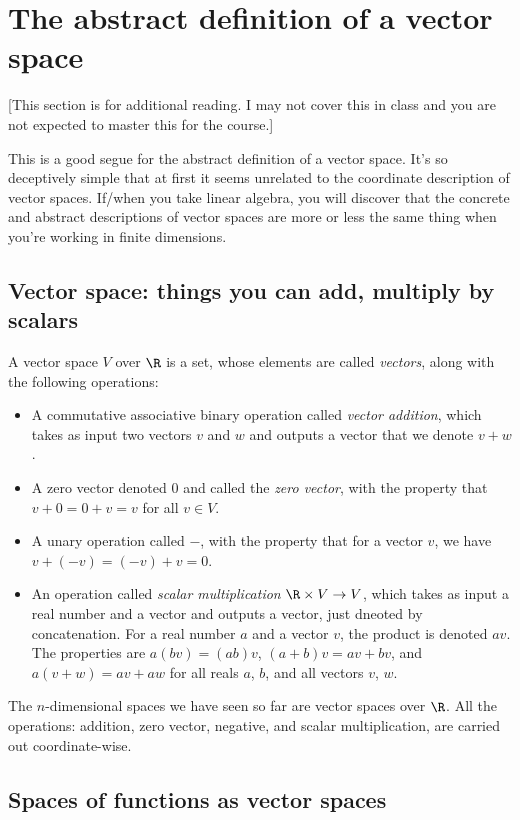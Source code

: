 \section{The abstract definition of a vector space}

[This section is for additional reading. I may not cover this in class
and you are not expected to master this for the course.]

This is a good segue for the abstract definition of a vector
space. It's so deceptively simple that at first it seems unrelated to
the coordinate description of vector spaces. If/when you take linear
algebra, you will discover that the concrete and abstract descriptions
of vector spaces are more or less the same thing when you're working
in finite dimensions.

\subsection{Vector space: things you can add, multiply by scalars}

A vector space $V$ over $\R$ is a set, whose elements are called {\em
vectors}, along with the following operations:

\begin{itemize}
\item A commutative associative binary operation called {\em vector
  addition}, which takes as input two vectors $v$ and $w$ and outputs
  a vector that we denote $v + w$.
\item A zero vector denoted $0$ and called the {\em zero vector}, with
  the property that $v + 0 = 0 + v = v$ for all $v \in V$.
\item A unary operation called $-$, with the property that for a
  vector $v$, we have $v + (-v) = (-v) + v = 0$.
\item An operation called {\em scalar multiplication} $\R \times V \to
  V$, which takes as input a real number and a vector and outputs a
  vector, just dneoted by concatenation. For a real number $a$ and a
  vector $v$, the product is denoted $av$. The properties are $a(bv) =
  (ab)v$, $(a + b)v = av + bv$, and $a(v + w) = av+ aw$ for all reals
  $a$, $b$, and all vectors $v$, $w$.
\end{itemize}

The $n$-dimensional spaces we have seen so far are vector spaces over
$\R$. All the operations: addition, zero vector, negative, and scalar
multiplication, are carried out coordinate-wise.

\subsection{Spaces of functions as vector spaces}

